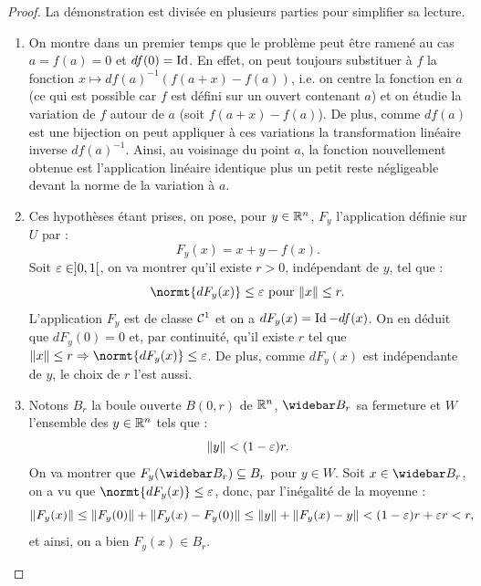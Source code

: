\begin{proof}
La démonstration est divisée en plusieurs parties pour simplifier sa lecture.
\begin{enumerate}[label=(\roman*)]

\item
On montre dans un premier temps que le problème peut être ramené au cas $a=f(a)=0$ et $df(0)=\operatorname{Id}$. 
En effet, on peut toujours substituer à $f$ la fonction $x \mapsto df(a)^{-1}(f(a+x) - f(a))$,
i.e. on \og centre \fg{} la fonction en $a$ (ce qui est possible car $f$ est défini sur un ouvert contenant $a$) et on étudie la variation
de $f$ autour de $a$ (soit $f(a+x)-f(a)$). De plus, comme $df(a)$ est une bijection on peut appliquer à ces variations la transformation
linéaire inverse $df(a)^{-1}$. Ainsi, au voisinage du point $a$, la fonction nouvellement obtenue est l'application linéaire identique plus
un petit reste négligeable devant la norme de la variation à $a$. \\

\item
Ces hypothèses étant prises, on pose, pour $y \in \mathbb{R}^n$, $F_y$ l'application définie sur $U$ par :
\[ F_y(x) = x + y - f(x) . \]
Soit $\varepsilon \in ]0,1[$, on va montrer qu'il existe $r>0$, indépendant de $y$, tel que :
\[ \normt{dF_y(x)} \leq \veps \text{ pour } \norm{x} \leq r . \]
L'application $F_y$ est de classe $\mathcal{C}^1$ et on a $dF_y(x) = \operatorname{Id} - df(x)$. 
On en déduit que $dF_y(0) = 0$ et, par continuité, qu'il existe $r$ tel que $\norm{x} \leq r \Rightarrow \normt{dF_y(x)} \leq \veps$.
De plus, comme $dF_y(x)$ est indépendante de $y$, le choix de $r$ l'est aussi. \\

\item
Notons $B_r$ la boule ouverte $B(0, r)$ de $\mathbb{R}^n$, $\Bfr$ sa fermeture et $W$ l'ensemble des $y \in \mathbb{R}^n$ tels que :
\[ \lVert y\rVert < (1-\varepsilon)r . \]
On va montrer que $F_y(\Bfr) \subset B_r$ pour $y \in W$.
Soit $x \in \Bfr$, on a vu que $\normt{dF_y(x)} \leq \veps$, donc, par l'inégalité de la moyenne :
\[ \lVert F_y(x)\rVert \leq \lVert F_y(0)\rVert + \lVert F_y(x) - F_y(0)\rVert \leq \lVert y\rVert + \lVert F_y(x) - y\rVert < (1-\varepsilon)r + \varepsilon r < r , \]
et ainsi, on a bien $F_y(x) \in B_r$.


\end{enumerate}
\end{proof}

